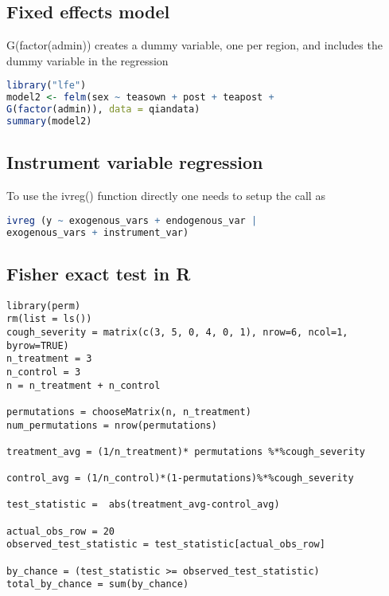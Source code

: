 \subsection {Fixed effects model} \label {r: fem}
G(factor(admin)) creates a dummy variable, one per region, and includes the dummy variable
in the regression
\begin{lstlisting}[language=R]
library("lfe")
model2 <- felm(sex ~ teasown + post + teapost + 
G(factor(admin)), data = qiandata)
summary(model2)
\end{lstlisting}

\subsection {Instrument variable regression}
To use the ivreg() function directly one needs to setup the call as
\begin{lstlisting}[language=R]
ivreg (y ~ exogenous_vars + endogenous_var | 
exogenous_vars + instrument_var)
\end{lstlisting}

\subsection {Fisher exact test in R}
\begin{lstlisting}
library(perm)
rm(list = ls())
cough_severity = matrix(c(3, 5, 0, 4, 0, 1), nrow=6, ncol=1, byrow=TRUE)
n_treatment = 3
n_control = 3
n = n_treatment + n_control

permutations = chooseMatrix(n, n_treatment)
num_permutations = nrow(permutations)

treatment_avg = (1/n_treatment)* permutations %*%cough_severity

control_avg = (1/n_control)*(1-permutations)%*%cough_severity

test_statistic =  abs(treatment_avg-control_avg)

actual_obs_row = 20
observed_test_statistic = test_statistic[actual_obs_row]

by_chance = (test_statistic >= observed_test_statistic)
total_by_chance = sum(by_chance)

\end{lstlisting}
